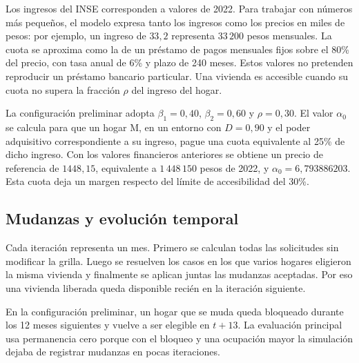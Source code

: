 Los ingresos del INSE corresponden a valores de 2022. Para trabajar con números más pequeños, el modelo expresa tanto los ingresos como los precios en miles de pesos: por ejemplo, un ingreso de $33{,}2$ representa $33\,200$ pesos mensuales. La cuota se aproxima como la de un préstamo de pagos mensuales fijos sobre el 80\% del precio, con tasa anual de 6\% y plazo de 240 meses. Estos valores no pretenden reproducir un préstamo bancario particular. Una vivienda es accesible cuando su cuota no supera la fracción $\rho$ del ingreso del hogar.

La configuración preliminar adopta $\beta_1=0{,}40$, $\beta_2=0{,}60$ y $\rho=0{,}30$. El valor $\alpha_0$ se calcula para que un hogar M, en un entorno con $D=0{,}90$ y el poder adquisitivo correspondiente a su ingreso, pague una cuota equivalente al 25\% de dicho ingreso. Con los valores financieros anteriores se obtiene un precio de referencia de $1448{,}15$, equivalente a $1\,448\,150$ pesos de 2022, y $\alpha_0=6{,}793886203$. Esta cuota deja un margen respecto del límite de accesibilidad del 30\%.

\subsection{Mudanzas y evolución temporal}

Cada iteración representa un mes. Primero se calculan todas las solicitudes sin modificar la grilla. Luego se resuelven los casos en los que varios hogares eligieron la misma vivienda y finalmente se aplican juntas las mudanzas aceptadas. Por eso una vivienda liberada queda disponible recién en la iteración siguiente.

En la configuración preliminar, un hogar que se muda queda bloqueado durante los 12 meses siguientes y vuelve a ser elegible en $t+13$. La evaluación principal usa permanencia cero porque con el bloqueo y una ocupación mayor la simulación dejaba de registrar mudanzas en pocas iteraciones.

